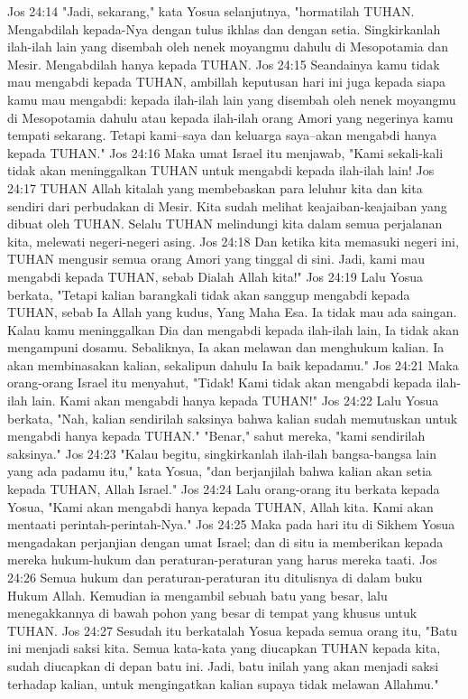 Jos 24:14  "Jadi, sekarang," kata Yosua selanjutnya, "hormatilah TUHAN. Mengabdilah kepada-Nya dengan tulus ikhlas dan dengan setia. Singkirkanlah ilah-ilah lain yang disembah oleh nenek moyangmu dahulu di Mesopotamia dan Mesir. Mengabdilah hanya kepada TUHAN.
Jos 24:15  Seandainya kamu tidak mau mengabdi kepada TUHAN, ambillah keputusan hari ini juga kepada siapa kamu mau mengabdi: kepada ilah-ilah lain yang disembah oleh nenek moyangmu di Mesopotamia dahulu atau kepada ilah-ilah orang Amori yang negerinya kamu tempati sekarang. Tetapi kami--saya dan keluarga saya--akan mengabdi hanya kepada TUHAN."
Jos 24:16  Maka umat Israel itu menjawab, "Kami sekali-kali tidak akan meninggalkan TUHAN untuk mengabdi kepada ilah-ilah lain!
Jos 24:17  TUHAN Allah kitalah yang membebaskan para leluhur kita dan kita sendiri dari perbudakan di Mesir. Kita sudah melihat keajaiban-keajaiban yang dibuat oleh TUHAN. Selalu TUHAN melindungi kita dalam semua perjalanan kita, melewati negeri-negeri asing.
Jos 24:18  Dan ketika kita memasuki negeri ini, TUHAN mengusir semua orang Amori yang tinggal di sini. Jadi, kami mau mengabdi kepada TUHAN, sebab Dialah Allah kita!"
Jos 24:19  Lalu Yosua berkata, "Tetapi kalian barangkali tidak akan sanggup mengabdi kepada TUHAN, sebab Ia Allah yang kudus, Yang Maha Esa. Ia tidak mau ada saingan. Kalau kamu meninggalkan Dia dan mengabdi kepada ilah-ilah lain, Ia tidak akan mengampuni dosamu. Sebaliknya, Ia akan melawan dan menghukum kalian. Ia akan membinasakan kalian, sekalipun dahulu Ia baik kepadamu."
Jos 24:21  Maka orang-orang Israel itu menyahut, "Tidak! Kami tidak akan mengabdi kepada ilah-ilah lain. Kami akan mengabdi hanya kepada TUHAN!"
Jos 24:22  Lalu Yosua berkata, "Nah, kalian sendirilah saksinya bahwa kalian sudah memutuskan untuk mengabdi hanya kepada TUHAN." "Benar," sahut mereka, "kami sendirilah saksinya."
Jos 24:23  "Kalau begitu, singkirkanlah ilah-ilah bangsa-bangsa lain yang ada padamu itu," kata Yosua, "dan berjanjilah bahwa kalian akan setia kepada TUHAN, Allah Israel."
Jos 24:24  Lalu orang-orang itu berkata kepada Yosua, "Kami akan mengabdi hanya kepada TUHAN, Allah kita. Kami akan mentaati perintah-perintah-Nya."
Jos 24:25  Maka pada hari itu di Sikhem Yosua mengadakan perjanjian dengan umat Israel; dan di situ ia memberikan kepada mereka hukum-hukum dan peraturan-peraturan yang harus mereka taati.
Jos 24:26  Semua hukum dan peraturan-peraturan itu ditulisnya di dalam buku Hukum Allah. Kemudian ia mengambil sebuah batu yang besar, lalu menegakkannya di bawah pohon yang besar di tempat yang khusus untuk TUHAN.
Jos 24:27  Sesudah itu berkatalah Yosua kepada semua orang itu, "Batu ini menjadi saksi kita. Semua kata-kata yang diucapkan TUHAN kepada kita, sudah diucapkan di depan batu ini. Jadi, batu inilah yang akan menjadi saksi terhadap kalian, untuk mengingatkan kalian supaya tidak melawan Allahmu."
